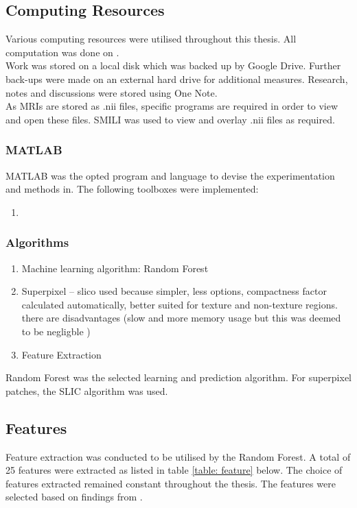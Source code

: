 \subsection{Computing Resources}
Various computing resources were utilised throughout this thesis. All computation was done on .
\\[1\baselineskip]
Work was stored on a local disk which was backed up by Google Drive. Further back-ups were made on an external hard drive for additional measures. Research, notes and discussions were stored using One Note.
\\[1\baselineskip]
As MRIs are stored as .nii files, specific programs are required in order to view and open these files. SMILI  was used to view and overlay .nii files as required. 
\subsubsection{MATLAB}
MATLAB was the opted program and language to devise the experimentation and methods in. The following toolboxes were implemented:
\begin{enumerate}
	\item {}
\end{enumerate} 
\subsubsection{Algorithms}
\begin{enumerate}
	\item  Machine learning algorithm: Random Forest
	\item  Superpixel  -- slico used because simpler, less options, compactness factor calculated automatically, better suited for texture and non-texture regions. there are disadvantages (slow and more memory usage but this was deemed to be negligble ) 
	
	\item  Feature Extraction
\end{enumerate}
Random Forest was the selected learning and prediction algorithm. For superpixel patches, the SLIC algorithm was used. \

\subsection{Features}
\label{sect:features}
Feature extraction was conducted to be utilised by the Random Forest. A total of 25 features were extracted as listed in table \ref{table: feature} below. The choice of features extracted remained constant throughout the thesis. The features were selected based on findings from . 

